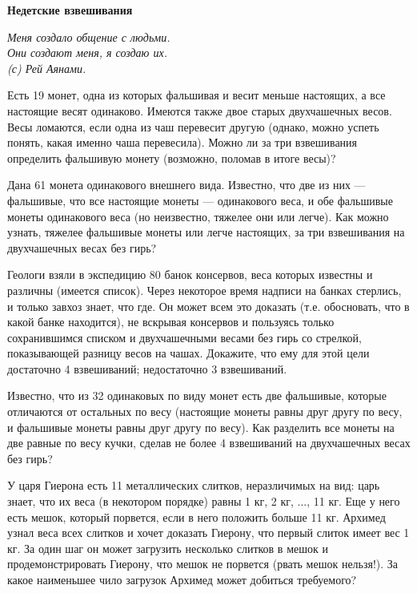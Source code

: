 \centerline{\bf \Huge Недетские взвешивания}

\begin{flushright}
        \scriptsize{\it Меня создало общение с людьми.\\
                        Они создают меня, я создаю их.\\
                        (с) Рей Аянами.}
\end{flushright}

Есть 19 монет, одна из которых фальшивая и весит меньше настоящих, а все настоящие весят одинаково. Имеются также двое старых двухчашечных весов. Весы ломаются, если одна из чаш перевесит другую (однако, можно успеть понять, какая именно чаша перевесила). Можно ли за три взвешивания определить фальшивую монету (возможно, поломав в итоге весы)?


Дана 61 монета одинакового внешнего вида. Известно, что две из них — фальшивые, что все настоящие монеты — одинакового веса, и обе фальшивые монеты одинакового веса (но неизвестно, тяжелее они или легче). Как можно узнать, тяжелее фальшивые монеты или легче настоящих, за три взвешивания на двухчашечных весах без гирь?

Геологи взяли в экспедицию 80 банок консервов, веса которых известны и различны (имеется список). Через некоторое время надписи на банках стерлись, и только завхоз знает, что где. Он может всем это доказать (т.е. обосновать, что в какой банке находится), не вскрывая консервов и пользуясь только сохранившимся списком и двухчашечными весами без гирь со стрелкой, показывающей разницу весов на чашах. Докажите, что ему для этой цели достаточно 4 взвешиваний; недостаточно 3 взвешиваний.



Известно, что из 32 одинаковых по виду монет есть две фальшивые, которые отличаются от остальных по весу (настоящие монеты равны друг другу по весу, и фальшивые монеты равны друг другу по весу). Как разделить все монеты на две равные по весу кучки, сделав не более 4 взвешиваний на двухчашечных весах без гирь?

У царя Гиерона есть 11 металлических слитков, неразличимых на вид: царь знает, что их веса (в некотором порядке) равны 1 кг, 2 кг, ..., 11 кг. Еще у него есть мешок, который порвется, если в него положить больше 11 кг. Архимед узнал веса всех слитков и хочет доказать Гиерону, что первый слиток имеет вес 1 кг. За один шаг он может загрузить несколько слитков в мешок и продемонстрировать Гиерону, что мешок не порвется (рвать мешок нельзя!). За какое наименьшее чило загрузок Архимед может добиться требуемого?

